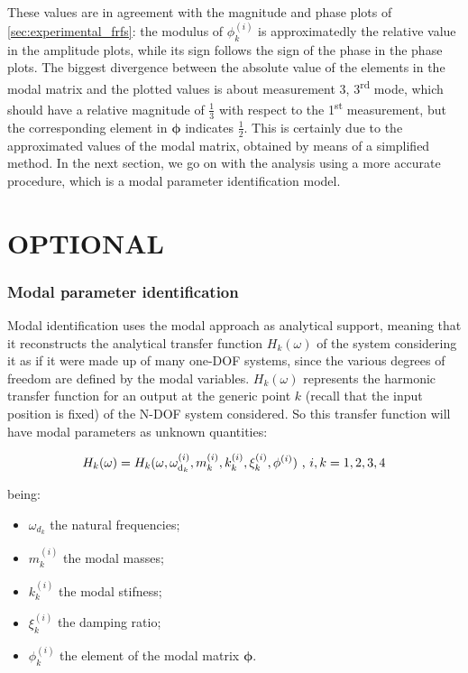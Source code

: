 \documentclass[a4paper,12pt,oneside]{article}
\begin{document}
These values are in agreement with the magnitude and phase plots of \ref{sec:experimental_frfs}: the modulus of $ \phi^{(i)}_k $ is approximatedly the relative value in the amplitude plots, while its sign follows the sign of the phase in the phase plots. The biggest divergence between the absolute value of the elements in the modal matrix and the plotted values is about measurement 3, 3\textsuperscript{rd} mode, which should have a relative magnitude of $ \frac{1}{3} $ with respect to the 1\textsuperscript{st} measurement, but the corresponding element in $ \bm{\phi} $ indicates $ \frac{1}{2} $. This is certainly due to the approximated values of the modal matrix, obtained by means of a simplified method. In the next section, we go on with the analysis using a more accurate procedure, which is a modal parameter identification model.

\clearpage


\part*{OPTIONAL}

\setcounter{section}{0}
\renewcommand{\thesection}{\roman{section}}

\section{Modal parameter identification}

Modal identification uses the modal approach as analytical support, meaning that
it reconstructs the analytical transfer function $ H_k( \omega) $ of the system considering it as if it were made up of many one-DOF systems, since the various degrees of freedom are defined by the modal variables. $ H_k ( \omega) $ represents the harmonic transfer function for an output at the generic point $ k $ (recall that the input position is fixed) of the N-DOF system considered. So this transfer function will have modal parameters as unknown quantities:

\[
	H_k(\omega) = H_k(\omega, \omega_{\textup{d}_k}^{(i)},
		m_k ^{(i)}, k_k ^{(i)}, \xi_k ^{(i)}, \mathbf{\phi}^{(i)})
		~ \text{,} ~ i,k = 1,2,3,4
\]

being:

\begin{itemize}
	\item $ \omega_{d_k} $ the natural frequencies;
	\item $ m_k ^{(i)} $ the modal masses;
	\item $ k_k ^{(i)} $ the modal stifness;
	\item $ \xi_k ^{(i)} $ the damping ratio;
	\item $ \phi_k^{(i)} $ the element of the modal matrix $ \bm{\phi} $.
\end{itemize}
\end{document}
